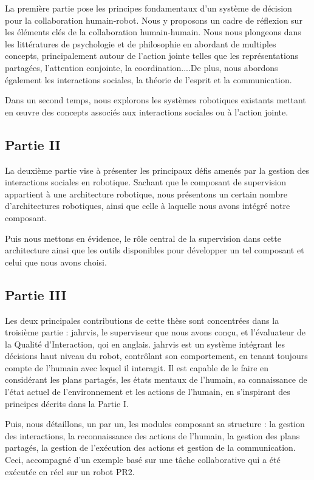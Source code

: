 La première partie pose les principes fondamentaux d'un système de décision pour la collaboration humain-robot. Nous y proposons un cadre de réflexion sur les éléments clés de la collaboration humain-humain. Nous nous plongeons dans les littératures de psychologie et de philosophie en abordant de multiples concepts, principalement autour de l'action jointe telles que les représentations partagées, l'attention conjointe, la coordination....De plus, nous abordons également les interactions sociales, la théorie de l'esprit et la communication. 

Dans un second temps, nous explorons les systèmes robotiques existants mettant en œuvre des concepts associés aux interactions sociales ou à l'action jointe.

\subsection*{Partie II}

La deuxième partie vise à présenter les principaux défis amenés par la gestion des interactions sociales en robotique. Sachant que le composant de supervision appartient à une architecture robotique, nous présentons un certain nombre d'architectures robotiques, ainsi que celle à laquelle nous avons intégré notre composant. 

Puis nous mettons en évidence, le rôle central de la supervision dans cette architecture ainsi que les outils disponibles pour développer un tel composant et celui que nous avons choisi.

\subsection*{Partie III}

Les deux principales contributions de cette thèse sont concentrées dans la troisième partie : \acrfull{jahrvis}, le superviseur que nous avons conçu, et l'évaluateur de la Qualité d'Interaction, \acrfull{qoi} en anglais. \acrshort{jahrvis} est un système intégrant les décisions haut niveau du robot, contrôlant son comportement, en tenant toujours compte de l'humain avec lequel il interagit. Il est capable de le faire en considérant les plans partagés, les états mentaux de l'humain, sa connaissance de l'état actuel de l'environnement et les actions de l'humain, en s'inspirant des principes décrits dans la Partie I. 

Puis, nous détaillons, un par un, les modules composant sa structure : la gestion des interactions, la reconnaissance des actions de l'humain, la gestion des plans partagés, la gestion de l'exécution des actions et gestion de la communication. Ceci, accompagné d'un exemple basé sur une tâche collaborative qui a été exécutée en réel sur un robot PR2. 

